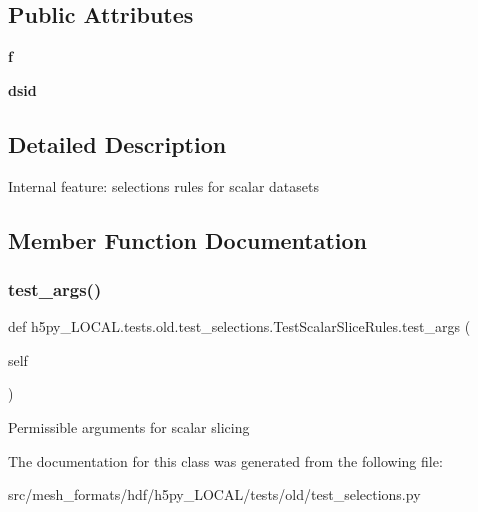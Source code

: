 \subsection*{Public Attributes}
\begin{DoxyCompactItemize}
\item 
\mbox{\label{classh5py__LOCAL_1_1tests_1_1old_1_1test__selections_1_1TestScalarSliceRules_a07393143b284bd3370af952251149506}} 
{\bfseries f}
\item 
\mbox{\label{classh5py__LOCAL_1_1tests_1_1old_1_1test__selections_1_1TestScalarSliceRules_a4f3e68f8d8c4e33a1902352893c1e56e}} 
{\bfseries dsid}
\end{DoxyCompactItemize}


\subsection{Detailed Description}
\begin{DoxyVerb}    Internal feature: selections rules for scalar datasets
\end{DoxyVerb}
 

\subsection{Member Function Documentation}
\mbox{\label{classh5py__LOCAL_1_1tests_1_1old_1_1test__selections_1_1TestScalarSliceRules_a4d2cd4a6982288c80a28d9888583e65c}} 
\subsubsection{\texorpdfstring{test\+\_\+args()}{test\_args()}}
{\footnotesize\ttfamily def h5py\+\_\+\+L\+O\+C\+A\+L.\+tests.\+old.\+test\+\_\+selections.\+Test\+Scalar\+Slice\+Rules.\+test\+\_\+args (\begin{DoxyParamCaption}\item[{}]{self }\end{DoxyParamCaption})}

\begin{DoxyVerb}Permissible arguments for scalar slicing \end{DoxyVerb}
 

The documentation for this class was generated from the following file\+:\begin{DoxyCompactItemize}
\item 
src/mesh\+\_\+formats/hdf/h5py\+\_\+\+L\+O\+C\+A\+L/tests/old/test\+\_\+selections.\+py\end{DoxyCompactItemize}
